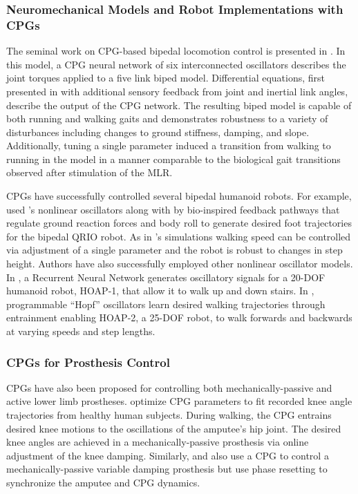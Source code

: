 \subsubsection{Neuromechanical Models and Robot Implementations with CPGs}
The seminal work on CPG-based bipedal locomotion control is presented in
\citet{taga1991self}. In this model, a CPG neural network of six interconnected
oscillators describes the joint torques applied to a five link biped model.
Differential equations, first presented in \citet{matsuoka1987mechanisms} with
additional sensory feedback from joint and inertial link angles, describe the
output of the CPG network. The resulting biped model is capable of both running
and walking gaits  and demonstrates robustness to a variety of disturbances
including changes to ground stiffness, damping, and slope. Additionally, tuning
a single parameter induced a transition from walking to running in the model in
a manner comparable to the biological gait transitions observed after
stimulation of the MLR.

CPGs have successfully controlled several bipedal humanoid robots. For example,
\citet{endo2005experimental} used \citeauthor{matsuoka1987mechanisms}'s
nonlinear oscillators along with by bio-inspired feedback pathways that regulate
ground reaction forces and body roll to generate desired foot trajectories for
the bipedal QRIO robot. As in \citeauthor{taga1991self}'s simulations walking
speed can be controlled via adjustment of a single parameter and the robot is
robust to changes in step height. Authors have also successfully employed other
nonlinear oscillator models. In \citet{shan2002neural}, a Recurrent Neural
Network generates oscillatory signals for a 20-DOF humanoid robot, HOAP-1, that
allow it to walk up and down stairs. In \citet{righetti2006programmable},
programmable ``Hopf'' oscillators \citep{righetti2006dynamic} learn desired
walking trajectories through entrainment enabling HOAP-2, a 25-DOF robot, to
walk forwards and backwards at varying speeds and step lengths.  

\subsubsection{CPGs for Prosthesis Control}
CPGs have also been proposed for controlling both mechanically-passive and
active lower limb prostheses.  \citet{nandi2009development} optimize CPG
parameters to fit recorded knee angle trajectories from healthy human subjects.
During walking, the CPG entrains desired knee motions to the oscillations of the
amputee's hip joint. The desired knee angles are achieved in a
mechanically-passive prosthesis via online adjustment of the knee damping.
Similarly, \citet{torrealba2010through} and \citet{mora2012cybernetic} also use
a CPG to control a mechanically-passive variable damping prosthesis but use
phase resetting to synchronize the amputee and CPG dynamics. 


